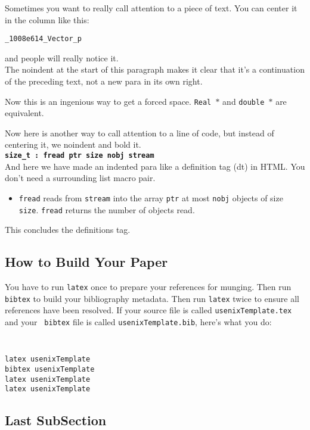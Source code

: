 \documentclass[letterpaper,twocolumn,10pt]{article}
\begin{document}
Sometimes you want to really call attention to a piece of text.  You
can center it in the column like this:
\begin{center}
{\tt \_1008e614\_Vector\_p}
\end{center}
and people will really notice it.\\

\noindent
The noindent at the start of this paragraph makes it clear that it's
a continuation of the preceding text, not a new para in its own right.


Now this is an ingenious way to get a forced space.
{\tt Real~$*$} and {\tt double~$*$} are equivalent.

Now here is another way to call attention to a line of code, but instead
of centering it, we noindent and bold it.\\

\noindent
{\bf \tt size\_t : fread ptr size nobj stream } \\

And here we have made an indented para like a definition tag (dt)
in HTML.  You don't need a surrounding list macro pair.
\begin{itemize}
\item[]  {\tt fread} reads from {\tt stream} into the array {\tt ptr} at
most {\tt nobj} objects of size {\tt size}.   {\tt fread} returns
the number of objects read.
\end{itemize}
This concludes the definitions tag.

\subsection{How to Build Your Paper}

You have to run {\tt latex} once to prepare your references for
munging.  Then run {\tt bibtex} to build your bibliography metadata.
Then run {\tt latex} twice to ensure all references have been resolved.
If your source file is called {\tt usenixTemplate.tex} and your {\tt
  bibtex} file is called {\tt usenixTemplate.bib}, here's what you do:
{\tt \small
\begin{verbatim}
latex usenixTemplate
bibtex usenixTemplate
latex usenixTemplate
latex usenixTemplate
\end{verbatim}
}


\subsection{Last SubSection}
\end{document}
